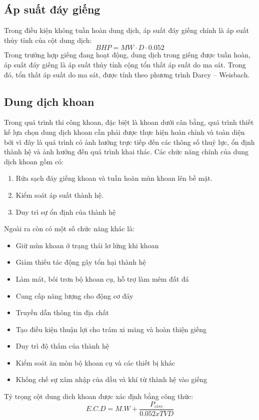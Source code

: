 \documentclass[12pt,a4paper]{article}
\begin{document}
\subsection{Áp suất đáy giếng}
Trong điều kiện không tuần hoàn dung dịch, áp suất đáy giếng chính là áp suất thủy tỉnh của cột dung dịch:
\begin{equation}
BHP = MW\cdot D \cdot 0.052
\end{equation}
Trong trường hợp giếng đang hoạt động, dung dịch trong giếng được tuần hoàn, áp suất đáy giếng là áp suất thủy tỉnh cộng tổn thất áp suất do ma sát. Trong đó, tổn thất áp suất do ma sát, được tính theo phương trình Darcy – Weisbach\cite{bourgoyne1991applied}.


\subsection{Dung dịch khoan}
Trong quá trình thi công khoan, đặc biệt là khoan dưới cân bằng, quá trình thiết kế lựa chọn dung dịch khoan cần phải được thực hiện hoàn chỉnh và toàn diện bởi vì đây là quá trình có ảnh hưởng trực tiếp đến các thông số thuỷ lực, ổn định thành hệ và ảnh hưởng đến quá trình khai thác. Các chức năng chính của dung dịch khoan gồm có:
\begin{enumerate}
	\item Rửa sạch đáy giếng khoan và tuần hoàn mùn khoan lên bề mặt.
	\item Kiểm soát áp suất thành hệ.
	\item Duy trì sự ổn định của thành hệ
\end{enumerate}
Ngoài ra còn có một số chức năng khác là:
\begin{itemize}
	\item Giữ mùn khoan ở trạng thái lơ lửng khi khoan
	\item Giảm thiếu tác động gây tổn hại thành hệ
	\item Làm mát, bôi trơn bộ khoan cụ, hỗ trợ làm mêm đất đá
	\item Cung cấp năng lượng cho động cơ đáy
	\item Truyền dẫn thông tin địa chất
	\item Tạo điều kiện thuận lợi cho trám xi măng và hoàn thiện giếng
	\item Duy trì độ thấm của thành hệ
	\item Kiểm soát ăn mòn bộ khoan cụ và các thiết bị khác
	\item Khống chế sự xâm nhập của dầu và khí từ thành hệ vào giếng
\end{itemize}
Tỷ trọng cột dung dich khoan được xác định bằng công thức\cite{bourgoyne1991applied}:
\begin{equation}
E.C.D = M.W +\frac{P_{circ}}{0.052xTVD}
\end{equation}
\end{document}
